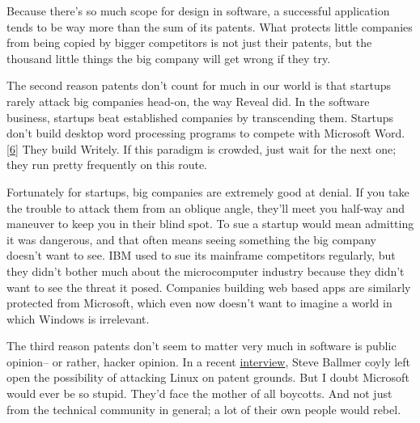 Because there's so much scope for
                  design in software, a successful application tends to be way
                  more than the sum of its patents. What protects little
                  companies from being copied by bigger competitors is not just
                  their patents, but the thousand little things the big company
                  will get wrong if they try.

The second reason
                  patents don't count for much in our world is that startups
                  rarely attack big companies head-on, the way Reveal did. In
                  the software business, startups beat established companies by
                  transcending them. Startups don't build desktop word
                  processing programs to compete with Microsoft Word.
                  [\href{\#f6n}{6}]
                  They build Writely. If this paradigm is crowded, just wait for
                  the next one; they run pretty frequently on this route.

Fortunately
                  for startups, big companies are extremely good at denial. If
                  you take the trouble to attack them from an oblique angle,
                  they'll meet you half-way and maneuver to keep you in their
                  blind spot. To sue a startup would mean admitting it was
                  dangerous, and that often means seeing something the big
                  company doesn't want to see. IBM used to sue its mainframe
                  competitors regularly, but they didn't bother much about the
                  microcomputer industry because they didn't want to see the
                  threat it posed. Companies building web based apps are
                  similarly protected from Microsoft, which even now doesn't
                  want to imagine a world in which Windows is irrelevant.

The
                  third reason patents don't seem to matter very much in
                  software is public opinion-- or rather, hacker opinion. In a
                  recent
                  \href{http://www.computing.co.uk/forbes/news/2152720/interview-steve-ballmer-linux}{interview}, Steve Ballmer coyly left open the possibility of attacking
                  Linux on patent grounds. But I doubt Microsoft would ever be
                  so stupid. They'd face the mother of all boycotts. And not
                  just from the technical community in general; a lot of their
                  own people would rebel.

